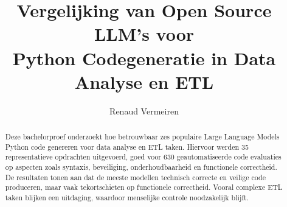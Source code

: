 \documentclass[a0,portrait]{hogent-poster}
\title{
    Vergelijking van Open Source LLM's voor\\
    Python Codegeneratie in Data Analyse en ETL
}
\author{Renaud Vermeiren}
\begin{document}
    
    \maketitle
    
    
    \begin{abstract}
        
        Deze bachelorproef onderzoekt hoe betrouwbaar zes populaire Large Language
        Models Python code genereren voor data analyse en ETL taken.
        Hiervoor werden 35 representatieve opdrachten uitgevoerd, goed voor
        630 geautomatiseerde code evaluaties op aspecten zoals syntaxis,
        beveiliging, onderhoudbaarheid en functionele correctheid.
        De resultaten tonen aan dat de meeste modellen technisch correcte en
        veilige code produceren, maar vaak tekortschieten op functionele
        correctheid. Vooral complexe ETL taken blijken een uitdaging,
        waardoor menselijke controle noodzakelijk blijft.
        
    \end{abstract}
    
\end{document}
